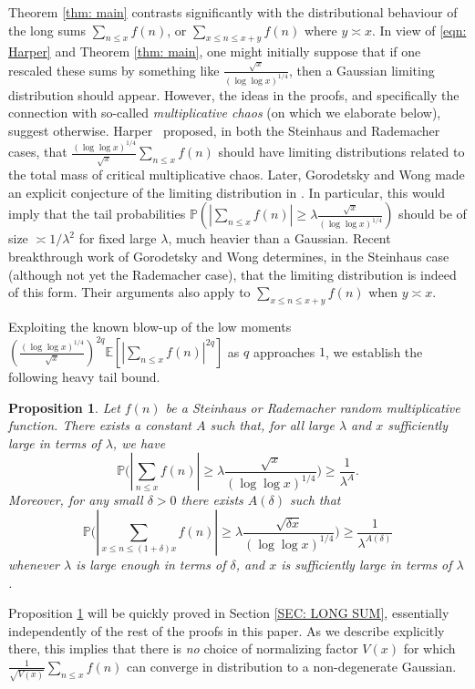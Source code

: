 \documentclass[12pt, notitlepage]{amsart}
\numberwithin{equation}{section}
\def\P{\mathbb P}
\def\E{\mathbb E}
\newtheorem{proposition}[theorem]{Proposition}
\theoremstyle{remark}
\theoremstyle{definition}
\theoremstyle{remark}
\numberwithin{equation}{section}
\begin{document}
\vspace{12pt}
Theorem \ref{thm: main} contrasts significantly with the distributional behaviour of the long sums $\sum_{n \leq x} f(n)$, or $\sum_{x\le n \le x+y}f(n)$ where $y \asymp x$. In view of  \eqref{eqn: Harper} and Theorem \ref{thm: main}, one might initially suppose that if one rescaled these sums by something like $\frac{\sqrt{x}}{(\log \log x)^{1/4}}$, then a Gaussian limiting distribution should appear. However, the ideas in the proofs, and specifically the connection with so-called {\em multiplicative chaos} (on which we elaborate below), suggest otherwise. Harper~\cite{HarperLow} proposed, in both the Steinhaus and Rademacher cases, that $\frac{(\log \log x)^{1/4}}{\sqrt{x}} \sum_{n \leq x} f(n)$ should have limiting distributions related to the total mass of critical multiplicative chaos. Later, Gorodetsky and Wong made an explicit conjecture of the limiting distribution in \cite[Conjecture 1.6]{GW24}. In particular, this would imply that the tail probabilities $\P\left(|\sum_{n \leq x} f(n)| \geq \lambda \frac{\sqrt{x}}{(\log\log x)^{1/4}} \right)$ should be of size $\asymp 1/\lambda^2$ for fixed large $\lambda$, much heavier than a Gaussian. Recent breakthrough work of Gorodetsky and Wong \cite{GW-Final} determines, in the Steinhaus case (although not yet the Rademacher case), that the limiting distribution is indeed of this form. Their arguments also apply to $\sum_{x\le n \le x+y}f(n)$ when $y \asymp x$.

Exploiting the known blow-up of the low moments $(\frac{(\log\log x)^{1/4}}{\sqrt{x}})^{2q} \E[|\sum_{n \leq x} f(n)|^{2q}]$ as $q$ approaches $1$, we establish the 
following heavy tail bound.
\begin{proposition}\label{prop: tailsprop}
Let $f(n)$ be a Steinhaus or Rademacher random multiplicative function. There exists a constant $A$ such that, for all large $\lambda$ and $x$ sufficiently large in terms of $\lambda$, we have
$$ 
\P\Big(|\sum_{n \leq x} f(n)| \geq \lambda \frac{\sqrt{x}}{(\log\log x)^{1/4}} \Big) \geq \frac{1}{\lambda^A}. 
$$
Moreover, for any small $\delta > 0$ there exists $A(\delta)$ such that
$$ 
\P\Big(|\sum_{x \leq n \leq (1+\delta)x} f(n)| \geq \lambda \frac{\sqrt{\delta x}}{(\log\log x)^{1/4}} \Big) \geq \frac{1}{\lambda^{A(\delta)}}
$$
whenever $\lambda$ is large enough in terms of $\delta$, and $x$ is sufficiently large in terms of $\lambda$.
\end{proposition}
Proposition \ref{prop: tailsprop} will be quickly proved in Section \ref{SEC: LONG SUM}, essentially independently of the rest of the proofs in this paper. As we describe explicitly there, this implies that there is {\em no} choice of normalizing factor $V(x)$ for which $\frac{1}{\sqrt{V(x)}} \sum_{n \leq x} f(n)$ can converge in distribution to a non-degenerate Gaussian.
\end{document}
